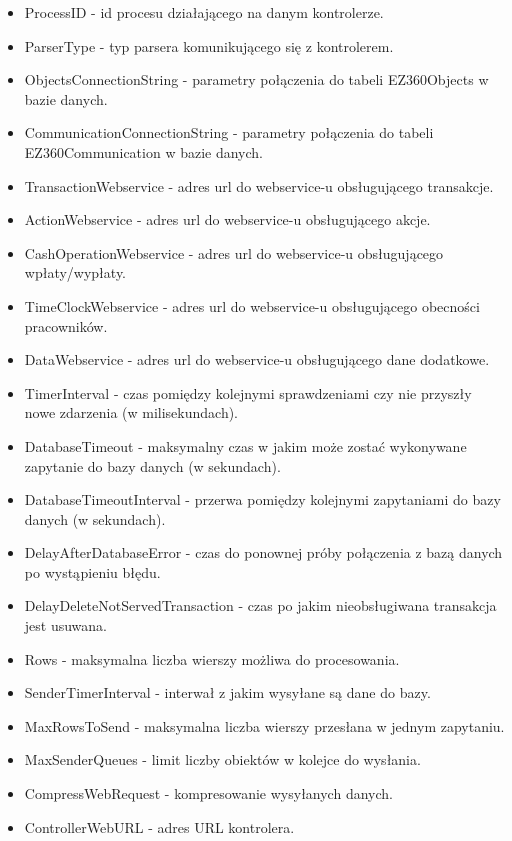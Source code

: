 \documentclass[a4paper]{book}
\begin{document}
\begin{itemize}
	\setlength\itemsep{0.1pt}
	\item ProcessID - id procesu działającego na danym kontrolerze.
	\item ParserType - typ parsera komunikującego się z kontrolerem.
	\item ObjectsConnectionString - parametry połączenia do tabeli EZ360Objects w bazie danych.
	\item CommunicationConnectionString - parametry połączenia do tabeli \newline EZ360Communication w bazie danych.
	\item TransactionWebservice - adres url do webservice-u obsługującego transakcje.
	\item ActionWebservice - adres url do webservice-u obsługującego akcje.
	\item CashOperationWebservice - adres url do webservice-u obsługującego wpłaty/wypłaty.
	\item TimeClockWebservice - adres url do webservice-u obsługującego obecności pracowników.
	\item DataWebservice - adres url do webservice-u obsługującego dane dodatkowe.
	\item TimerInterval - czas pomiędzy kolejnymi sprawdzeniami czy nie przyszły nowe zdarzenia (w milisekundach).
	\item DatabaseTimeout - maksymalny czas w jakim może zostać wykonywane zapytanie do bazy danych (w sekundach).
	\item DatabaseTimeoutInterval - przerwa pomiędzy kolejnymi zapytaniami do bazy danych (w sekundach).
	\item DelayAfterDatabaseError - czas do ponownej próby połączenia z bazą danych po wystąpieniu błędu.
	\item DelayDeleteNotServedTransaction - czas po jakim nieobsługiwana transakcja jest usuwana.
	\item Rows - maksymalna liczba wierszy możliwa do procesowania.
	\item SenderTimerInterval - interwał z jakim wysyłane są dane do bazy.
	\item MaxRowsToSend - maksymalna liczba wierszy przesłana w jednym zapytaniu.
	\item MaxSenderQueues - limit liczby obiektów w kolejce do wysłania.
	\item CompressWebRequest - kompresowanie wysyłanych danych.
	\item ControllerWebURL - adres URL kontrolera.
\end{itemize}
\end{document}
